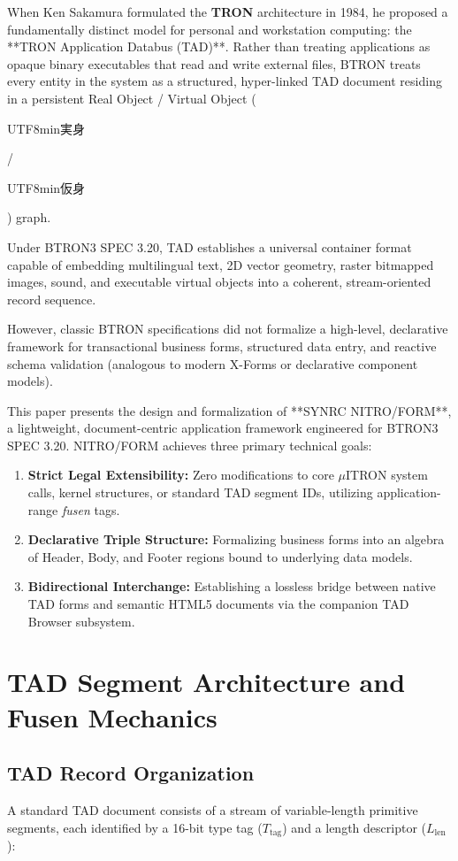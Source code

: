 \documentclass[10pt,journal,compsoc,twocolumn]{article}
\newcommand{\ja}[1]{\begin{CJK*}{UTF8}{min}#1\end{CJK*}}
\begin{document}
When Ken Sakamura formulated the \textbf{TRON} architecture in 1984, he proposed a fundamentally distinct model for personal and workstation computing: the **TRON Application Databus (TAD)**. Rather than treating applications as opaque binary executables that read and write external files, BTRON treats every entity in the system as a structured, hyper-linked TAD document residing in a persistent Real Object / Virtual Object (\ja{実身}/\ja{仮身}) graph.

Under BTRON3 SPEC 3.20, TAD establishes a universal container format capable of embedding multilingual text, 2D vector geometry, raster bitmapped images, sound, and executable virtual objects into a coherent, stream-oriented record sequence.

However, classic BTRON specifications did not formalize a high-level, declarative framework for transactional business forms, structured data entry, and reactive schema validation (analogous to modern X-Forms or declarative component models).

This paper presents the design and formalization of **SYNRC NITRO/FORM**, a lightweight, document-centric application framework engineered for BTRON3 SPEC 3.20. NITRO/FORM achieves three primary technical goals:
\begin{enumerate}[leftmargin=*]
    \item \textbf{Strict Legal Extensibility:} Zero modifications to core $\mu$ITRON system calls, kernel structures, or standard TAD segment IDs, utilizing application-range \emph{fusen} tags.
    \item \textbf{Declarative Triple Structure:} Formalizing business forms into an algebra of Header, Body, and Footer regions bound to underlying data models.
    \item \textbf{Bidirectional Interchange:} Establishing a lossless bridge between native TAD forms and semantic HTML5 documents via the companion TAD Browser subsystem.
\end{enumerate}

\section{TAD Segment Architecture and Fusen Mechanics}
\label{sec:tad_foundations}

\subsection{TAD Record Organization}
A standard TAD document consists of a stream of variable-length primitive segments, each identified by a 16-bit type tag ($T_{\text{tag}}$) and a length descriptor ($L_{\text{len}}$):
\end{document}
